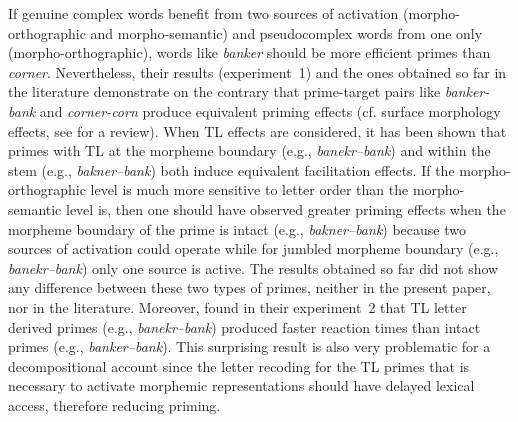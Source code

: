 \documentclass[output=paper]{langsci/langscibook}
\begin{document}
If genuine complex words benefit from two sources of activation (morpho-ortho\-graph\-ic and morpho-semantic) and pseudocomplex words from
one only (morpho-or\-tho\-graph\-ic), words like \emph{banker} should be more
efficient primes than \emph{corner}. Nevertheless, their results (experiment~1) and the ones obtained so far in the literature demonstrate on the
contrary that prime-target pairs like \emph{banker-bank} and
\emph{corner-corn} produce equivalent priming effects (cf. surface
morphology effects, see %
\citealt{RastleDavis2008} %
 for a review). When TL
effects are considered, it has been shown that primes with TL at the
morpheme boundary (e.g., \emph{banekr--bank}) and within the stem (e.g.,
\emph{bakner--bank}) both induce equivalent facilitation effects. If the
morpho-orthographic level is much more sensitive to letter order than
the morpho-semantic level is, then one should have observed greater
priming effects when the morpheme boundary of the prime is intact (e.g.,
\emph{bakner--bank}) because two sources of activation could operate
while for jumbled morpheme boundary (e.g., \emph{banekr--bank}) only one
source is active. The results obtained so far did not show any
difference between these two types of primes, neither in the present
paper, nor in the literature. Moreover, %
\citet{DiependaeleMorrisEtAl2013} %
%
found
in their experiment~2 that TL letter derived primes (e.g., \emph{banekr--bank})
produced faster reaction times than intact primes (e.g.,
\emph{banker--bank}). This surprising result is also very problematic for
a decompositional account since the letter recoding for the TL primes
that is necessary to activate morphemic representations should have
delayed lexical access, therefore reducing priming.
\end{document}
